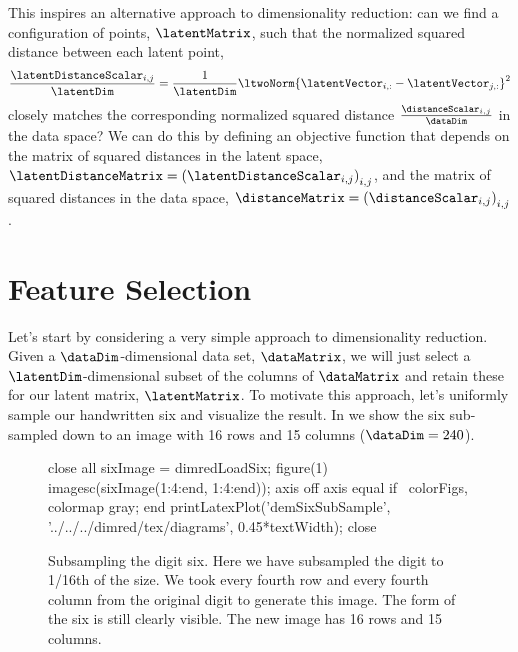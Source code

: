 This inspires an alternative approach to dimensionality reduction: can
we find a configuration of points, $\latentMatrix$, such that the
normalized squared distance between each latent point,
\[
\frac{\latentDistanceScalar_{i,j}}{\latentDim}=\frac{1}{\latentDim}\ltwoNorm{\latentVector_{i,:}-\latentVector_{j,:}}^2
\]
closely matches the corresponding normalized squared distance
$\frac{\distanceScalar_{i,j}}{\dataDim}$ in the data space? We can do
this by defining an objective function that depends on the matrix of
squared distances in the latent space,
$\latentDistanceMatrix=\left(\latentDistanceScalar_{i,j}\right)_{i,j}$,
and the matrix of squared distances in the data space,
$\distanceMatrix=\left(\distanceScalar_{i,j}\right)_{i,j}$.

\section{Feature Selection}

Let's start by considering a very simple approach to dimensionality
reduction. Given a $\dataDim$-dimensional data set, $\dataMatrix$, we
will just select a $\latentDim$-dimensional subset of the columns of
$\dataMatrix$ and retain these for our latent matrix,
$\latentMatrix$. To motivate this approach, let's uniformly sample our
handwritten six and visualize the result. In  we show the six sub-sampled down to an image with 16 rows and 15 columns ($\dataDim=240$). 
\begin{figure}
  \begin{octave}
    close all
    sixImage = dimredLoadSix;
    figure(1)
    imagesc(sixImage(1:4:end, 1:4:end));
    axis off
    axis equal
    if ~colorFigs, colormap gray; end
    printLatexPlot('demSixSubSample', '../../../dimred/tex/diagrams', 0.45*textWidth);
    close
  \end{octave}
  \begin{center}
    
  \end{center}
  
  \caption{Subsampling the digit six. Here we have subsampled the
    digit to 1/16th of the size. We took every fourth row and every
    fourth column from the original digit to generate this image. The
    form of the six is still clearly visible. The new image has 16
    rows and 15 columns.}\label{fig:subSampleSix}
\end{figure}

